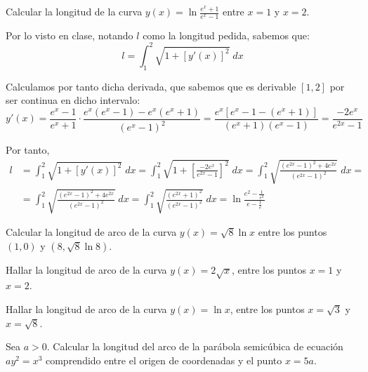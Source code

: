 \begin{ejercicio}
    Calcular la longitud de la curva $y(x)=\ln \frac{e^x+1}{e^x-1}$ entre $x=1$ y $x=2$.

    Por lo visto en clase, notando $l$ como la longitud pedida, sabemos que:
    \begin{equation*}
        l=\int_1^2 \sqrt{1+[y'(x)]^2}\;dx
    \end{equation*}


    Calculamos por tanto dicha derivada, que sabemos que es derivable $[1,2]$ por ser continua en dicho intervalo:
    \begin{equation*}
        y'(x) = \frac{e^x-1}{e^x+1}\cdot \frac{e^x(e^x-1) -e^x(e^x+1)}{(e^x-1)^2} = \frac{e^x[e^x-1-(e^x+1)]}{(e^x+1)(e^x-1)}
        = \frac{-2e^x}{e^{2x}-1}
    \end{equation*}

    Por tanto,
    \begin{equation*}\begin{split}
        l&=\int_1^2 \sqrt{1+[y'(x)]^2}\;dx
        = \int_1^2 \sqrt{1+\left[\frac{-2e^x}{e^{2x}-1}\right]^2}\;dx
        = \int_1^2 \sqrt{\frac{(e^{2x}-1)^2 + 4e^{2x}}{(e^{2x}-1)^2}}\;dx =\\
        &= \int_1^2 \sqrt{\frac{(e^{2x}-1)^2 + 4e^{2x}}{(e^{2x}-1)^2}}\;dx
        = \int_1^2 \sqrt{\frac{(e^{2x}+1)^2}{(e^{2x}-1)^2}}\;dx = \ln \frac{e^2-\frac{1}{e^2}}{e-\frac{1}{e}}
    \end{split}\end{equation*}
    
\end{ejercicio}

\begin{ejercicio}
    Calcular la longitud de arco de la curva $y(x)=\sqrt{8}\ln x$ entre los puntos $(1,0)$ y $(8,\sqrt{8} \ln8)$.
\end{ejercicio}

\begin{ejercicio}
    Hallar la longitud de arco de la curva $y(x)=2\sqrt{x}$, entre los puntos $x=1$ y $x=2$.
\end{ejercicio}

\begin{ejercicio}
    Hallar la longitud de arco de la curva $y(x)=\ln{x}$, entre los puntos $x=\sqrt{3}$ y $x=\sqrt{8}$.
\end{ejercicio}

\begin{ejercicio}
    Sea $a>0$. Calcular la longitud del arco de la parábola semicúbica de ecuación $ay^2=x^3$ comprendido entre el origen de coordenadas y el punto $x=5a$.
\end{ejercicio}

